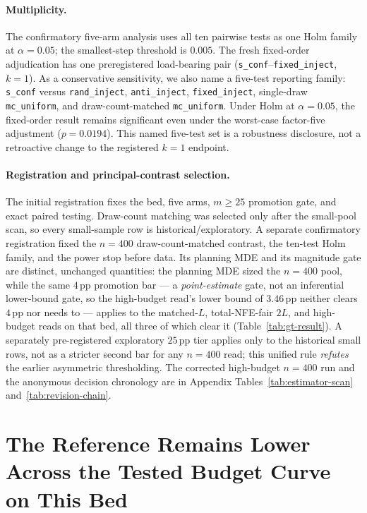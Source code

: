 \documentclass{article}
\newcommand{\sconf}{\texttt{s\_conf}}
\newcommand{\rinj}{\texttt{rand\_inject}}
\newcommand{\ainj}{\texttt{anti\_inject}}
\newcommand{\finj}{\texttt{fixed\_inject}}
\newcommand{\mcu}{\texttt{mc\_uniform}}
\newcommand{\pp}{\,\mathrm{pp}}
\begin{document}
\paragraph{Multiplicity.}
The confirmatory five-arm analysis uses all ten pairwise tests as one Holm
family \citep{holm1979} at $\alpha=0.05$; the smallest-step threshold is $0.005$.  The fresh
fixed-order adjudication has one preregistered load-bearing pair
(\sconf{}--\finj{}, $k=1$).  As a conservative sensitivity, we also name a
five-test reporting family: \sconf{} versus \rinj{}, \ainj{}, \finj{},
single-draw \mcu{}, and draw-count-matched \mcu{}.  Under Holm at
$\alpha=0.05$, the fixed-order result remains significant even under the
worst-case factor-five adjustment ($p=0.0194$).  This named five-test set is a
robustness disclosure, not a retroactive change to the registered $k=1$
endpoint.



\paragraph{Registration and principal-contrast selection.}
The initial registration fixes the bed, five arms, $m{\geq}25$ promotion gate,
and exact paired testing.  Draw-count matching was selected only after the
small-pool scan, so every small-sample row is historical/exploratory.  A
separate confirmatory registration fixed the $n=400$ draw-count-matched
contrast, the ten-test Holm family, and the power stop before data.  Its
planning MDE and its magnitude gate are distinct, unchanged quantities: the
planning MDE sized the $n=400$ pool, while the same $4\pp$ promotion bar --- a
\emph{point-estimate} gate, not an inferential lower-bound gate, so the
high-budget read's lower bound of $3.46\pp$ neither clears $4\pp$ nor needs to
--- applies to the matched-$L$, total-NFE-fair $2L$, and high-budget reads on
that bed, all three of which clear it (Table~\ref{tab:gt-result}).  A
separately pre-registered exploratory $25\pp$ tier applies only to the
historical small rows, not as a stricter second bar for any $n=400$ read; this
unified rule \emph{refutes} the earlier asymmetric thresholding.  The corrected
high-budget $n=400$ run and the anonymous decision chronology are in Appendix
Tables~\ref{tab:estimator-scan} and~\ref{tab:revision-chain}.
\section{The Reference Remains Lower Across the Tested Budget Curve on This Bed}
\label{sec:result1}
\end{document}
